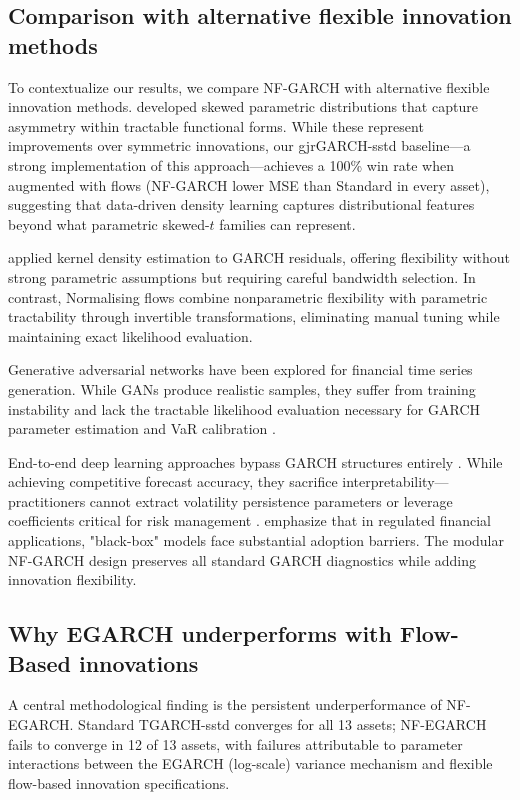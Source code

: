 \documentclass[risks,article,submit,pdftex,moreauthors]{Definitions/mdpi}
\begin{document}
\subsection{Comparison with alternative flexible innovation methods}

To contextualize our results, we compare NF-GARCH with alternative flexible innovation methods. \cite{fernandez1998multivariate} developed skewed parametric distributions that capture asymmetry within tractable functional forms. While these represent improvements over symmetric innovations, our gjrGARCH-sstd baseline—a strong implementation of this approach—achieves a 100\% win rate when augmented with flows (NF-GARCH lower MSE than Standard in every asset), suggesting that data-driven density learning captures distributional features beyond what parametric skewed-$t$ families can represent.

\cite{engle1993measuring} applied kernel density estimation to GARCH residuals, offering flexibility without strong parametric assumptions but requiring careful bandwidth selection. In contrast, Normalising flows combine nonparametric flexibility with parametric tractability through invertible transformations, eliminating manual tuning while maintaining exact likelihood evaluation.

Generative adversarial networks \citep{goodfellow2014generative, wiese2020quant} have been explored for financial time series generation. While GANs produce realistic samples, they suffer from training instability  and lack the tractable likelihood evaluation necessary for GARCH parameter estimation and VaR calibration \citep{arjovsky2017wasserstein}.

End-to-end deep learning approaches  bypass GARCH structures entirely \citep{kim2018forecasting}. While achieving competitive forecast accuracy, they sacrifice interpretability—practitioners cannot extract volatility persistence parameters or leverage coefficients critical for risk management \citep{rudin2019stop}. \cite{harvey2022machine} emphasize that in regulated financial applications, "black-box" models face substantial adoption barriers. The modular NF-GARCH design preserves all standard GARCH diagnostics while adding innovation flexibility.

\subsection{Why EGARCH underperforms with Flow-Based innovations}
A central methodological finding is the persistent underperformance of NF-EGARCH. Standard TGARCH-sstd converges for all 13 assets; NF-EGARCH fails to converge in 12 of 13 assets, with failures attributable to parameter interactions between the EGARCH (log-scale) variance mechanism and flexible flow-based innovation specifications.
\end{document}
